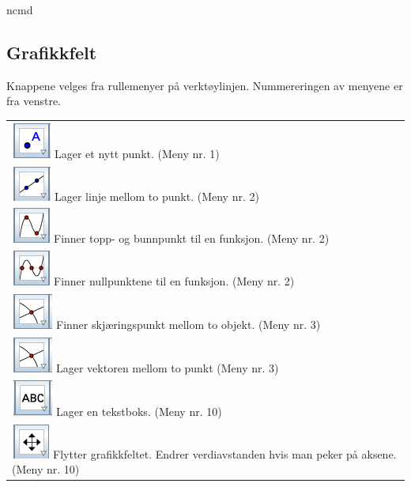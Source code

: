 



{ncmd}

\renewcommand{\arraystretch}{1.5}	
\subsection*{Grafikkfelt}
Knappene velges fra rullemenyer på verktøylinjen. Nummereringen av menyene er fra venstre.\vsk

\begin{tabular}{@{}l}
	\,\includegraphics[scale=0.4]{fig/pkt} Lager et nytt punkt. (Meny nr. 1) \\
	\,\includegraphics[scale=0.4]{fig/lin} Lager linje mellom to punkt. (Meny nr. 2)\\	
	\,\includegraphics[scale=0.4]{fig/ekst} Finner topp- og bunnpunkt til en funksjon. (Meny nr. 2)\\
	\,\includegraphics[scale=0.4]{fig/nul} Finner nullpunktene til en funksjon. (Meny nr. 2)	\\
	\,\includegraphics[scale=0.4]{fig/skj} Finner skjæringspunkt mellom to objekt. (Meny nr. 3)\\	
	\,\includegraphics[scale=0.4]{fig/skj} Lager vektoren mellom to punkt (Meny nr. 3)\\		
	\,\includegraphics[scale=0.4]{fig/tekst} Lager en tekstboks. (Meny nr. 10)\\		
	\,\includegraphics[scale=0.4]{fig/flytt} Flytter grafikkfeltet. Endrer verdiavstanden hvis man peker på aksene. (Meny nr. 10)\\			
\end{tabular}
